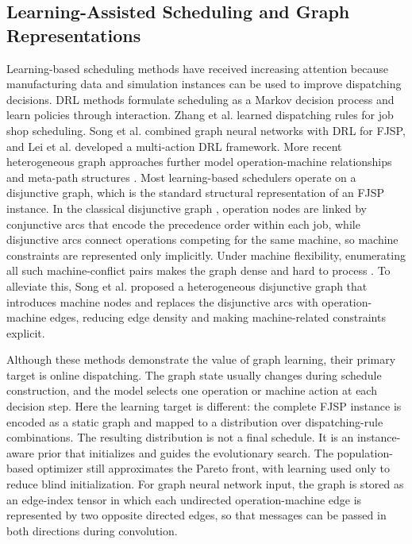 \documentclass[pdflatex,iicol,Numbered,sn-basic]{sn-jnl}
\begin{document}
\subsection{Learning-Assisted Scheduling and Graph Representations}\label{subsec:learning_lit}
Learning-based scheduling methods have received increasing attention because manufacturing data and simulation instances can be used to improve dispatching decisions. DRL methods formulate scheduling as a Markov decision process and learn policies through interaction.
Zhang et al. \cite{zhang2020learning} learned dispatching rules for job shop scheduling. Song et al. \cite{song2022flexible} combined graph neural networks with DRL for FJSP, and Lei et al. \cite{lei2022multi} developed a multi-action DRL framework. More recent heterogeneous graph approaches further model operation-machine relationships and meta-path structures \cite{wan2024flexible}.
Most learning-based schedulers operate on a disjunctive graph, which is the standard structural representation of an FJSP instance.
In the classical disjunctive graph \cite{roy1964problemes}, operation nodes are linked by conjunctive arcs that encode the precedence order within each job, while disjunctive arcs connect operations competing for the same machine, so machine constraints are represented only implicitly.
Under machine flexibility, enumerating all such machine-conflict pairs makes the graph dense and hard to process \cite{zhang2020learning}.
To alleviate this, Song et al. \cite{song2022flexible} proposed a heterogeneous disjunctive graph that introduces machine nodes and replaces the disjunctive arcs with operation-machine edges, reducing edge density and making machine-related constraints explicit.

Although these methods demonstrate the value of graph learning, their primary target is online dispatching. The graph state usually changes during schedule construction, and the model selects one operation or machine action at each decision step.
Here the learning target is different: the complete FJSP instance is encoded as a static graph and mapped to a distribution over dispatching-rule combinations.
The resulting distribution is not a final schedule. It is an instance-aware prior that initializes and guides the evolutionary search. The population-based optimizer still approximates the Pareto front, with learning used only to reduce blind initialization.
For graph neural network input, the graph is stored as an edge-index tensor in which each undirected operation-machine edge is represented by two opposite directed edges, so that messages can be passed in both directions during convolution.
\end{document}
